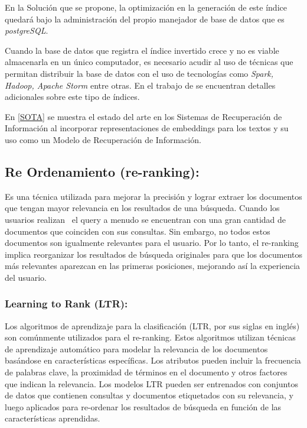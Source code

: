 \documentclass[
  10,
  openany]{book}
\begin{document}
En la Solución que se propone, la optimización en la generación de este índice quedará bajo la administración del propio manejador de base de datos que es \emph{postgreSQL}.

Cuando la base de datos que registra el índice invertido crece y no es viable almacenarla en un único computador, es necesario acudir al uso de técnicas que permitan distribuir la base de datos con el uso de tecnologías como \emph{Spark, Hadoop, Apache Storm} entre otras. En el trabajo de \citep{Mahapatra2011} se encuentran detalles adicionales sobre este tipo de índices.

En \ref{SOTA} se muestra el estado del arte en los Sistemas de Recuperación de Información al incorporar representaciones de embeddings \citep{reimers2019} para los textos y su uso como un Modelo de Recuperación de Información.

\hypertarget{re-ordenamiento-re-ranking}{%
\subsection{Re Ordenamiento (re-ranking):}\label{re-ordenamiento-re-ranking}}

Es una técnica utilizada para mejorar la precisión y lograr extraer los documentos que tengan mayor relevancia en los resultados de una búsqueda. Cuando los usuarios realizan ~el query a menudo se encuentran con una gran cantidad de documentos que coinciden con sus consultas. Sin embargo, no todos estos documentos son igualmente relevantes para el usuario. Por lo tanto, el re-ranking implica reorganizar los resultados de búsqueda originales para que los documentos más relevantes aparezcan en las primeras posiciones, mejorando así la experiencia del usuario.

\hypertarget{learning-to-rank-ltr}{%
\subsubsection{Learning to Rank (LTR):}\label{learning-to-rank-ltr}}

Los algoritmos de aprendizaje para la clasificación (LTR, por sus siglas en inglés) son comúnmente utilizados para el re-ranking. Estos algoritmos utilizan técnicas de aprendizaje automático para modelar la relevancia de los documentos basándose en características específicas. Los atributos pueden incluir la frecuencia de palabras clave, la proximidad de términos en el documento y otros factores que indican la relevancia. Los modelos LTR pueden ser entrenados con conjuntos de datos que contienen consultas y documentos etiquetados con su relevancia, y luego aplicados para re-ordenar los resultados de búsqueda en función de las características aprendidas.
\end{document}
